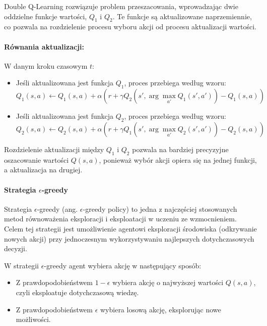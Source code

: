 Double Q-Learning rozwiązuje problem przeszacowania, wprowadzając dwie oddzielne funkcje wartości, \(Q_1\) i \(Q_2\). Te funkcje są aktualizowane naprzemiennie, co pozwala na rozdzielenie procesu wyboru akcji od procesu aktualizacji wartości.

\paragraph{Równania aktualizacji:}
W danym kroku czasowym \(t\):
\begin{itemize}
	\item Jeśli aktualizowana jest funkcja \(Q_1\), proces przebiega według wzoru:
	      \begin{equation}Q_1(s, a) \leftarrow Q_1(s, a) + \alpha \left( r + \gamma Q_2(s', \arg\max_{a'} Q_1(s', a')) - Q_1(s, a) \right)\end{equation}
	\item Jeśli aktualizowana jest funkcja \(Q_2\), proces przebiega według wzoru:
	      \begin{equation}Q_2(s, a) \leftarrow Q_2(s, a) + \alpha \left( r + \gamma Q_1(s', \arg\max_{a'} Q_2(s', a')) - Q_2(s, a) \right)\end{equation}
\end{itemize}

Rozdzielenie aktualizacji między \(Q_1\) i \(Q_2\) pozwala na bardziej precyzyjne oszacowanie wartości \(Q(s, a)\), ponieważ wybór akcji opiera się na jednej funkcji, a aktualizacja na drugiej.

\paragraph{Strategia \(\epsilon\)-greedy}

Strategia \(\epsilon\)-greedy (ang. \(\epsilon\)-greedy policy) to jedna z najczęściej stosowanych metod równoważenia eksploracji i eksploatacji w uczeniu ze wzmocnieniem. Celem tej strategii jest umożliwienie agentowi eksploracji środowiska (odkrywanie nowych akcji) przy jednoczesnym wykorzystywaniu najlepszych dotychczasowych decyzji.

W strategii \(\epsilon\)-greedy agent wybiera akcję w następujący sposób:
\begin{itemize}
	\item Z prawdopodobieństwem \(1 - \epsilon\) wybiera akcję o najwyższej wartości \(Q(s, a)\), czyli eksploatuje dotychczasową wiedzę.
	\item Z prawdopodobieństwem \(\epsilon\) wybiera losową akcję, eksplorując nowe możliwości.
\end{itemize}

